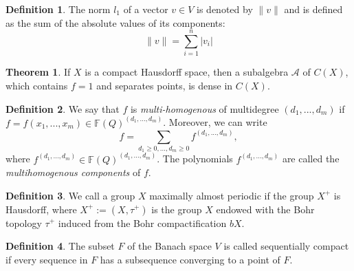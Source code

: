 \documentclass[12pt,a4paper]{report}
\theoremstyle{definition}
\newtheorem{theorem}{Theorem}
\newtheorem{definition}{Definition}
\begin{document}
\begin{appendix}

\begin{definition}
	The norm $l_1$ of a vector $v\in V$ is denoted by $\|v\|$ and is defined as the sum of the absolute values of its components:
	\begin{equation}
		\|v \|=\sum_{i=1}^{n} |v_i|
	\end{equation}	
\end{definition}

\begin{theorem}\parencite[see][Stone-Weierstrass theorem]{borwein1995polynomials}
	If $X$ is a compact Hausdorff space, then a subalgebra $\mathcal{A}$ of $C(X)$, which contains $f=1$ and separates points, is dense in $C(X)$.
\end{theorem}

\begin{definition}\parencite{cioletti2017polynomial}
	 We say that $f$ is\textit{ multi-homogenous} of multidegree $(d_1, . . . , d_m)$ if $f=f(x_1, . . . , x_m) \in \mathbb{F}(Q)^{(d_1,...,d_m)}$. Moreover, we can write 
	 \begin{equation}
	 	f=\sum_{d_1\geq 0,..., d_m\geq 0} f^{(d_1,...,d_m)},
	 \end{equation}
 where $f^{(d_1,...,d_m)} \in \mathbb{F}(Q)^{(d_1,...,d_m)}$. The polynomials $f^{(d_1,...,d_m)}$ are called the  \textit{multihomogenous components} of $f$.
\end{definition}
\begin{definition}\parencite{neumann1934almost}
	We call a group $X$ maximally almost periodic if the group $X^+$ is Hausdorff, where $X^+ := (X, \tau^+)$ is the group $X$ endowed with	the Bohr topology $\tau ^+$ induced from the Bohr compactification $bX$.
\end{definition}

\begin{definition}\parencite{zaanen2012introduction}
	The subset $F$ of the Banach space $V$ is called sequentially compact if
	every sequence in $F$ has a subsequence converging to a point of $F$.
\end{definition}
 



\end{appendix}
\end{document}
